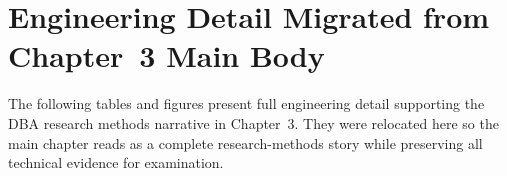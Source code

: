 \renewcommand{\arraystretch}{1.0}

\fi %

\section{Engineering Detail Migrated from Chapter~3 Main Body}\label{sec:appendix_ch3_migrated}
The following tables and figures present full engineering detail supporting the DBA research methods narrative in Chapter~3. They were relocated here so the main chapter reads as a complete research-methods story while preserving all technical evidence for examination.

